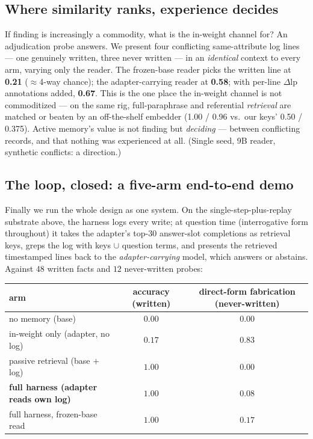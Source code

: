 \documentclass[11pt]{article}
\newcommand{\dlp}{\Delta\mathrm{lp}}
\begin{document}
\subsection{Where similarity ranks, experience decides}\label{sec:adjudication}

If finding is increasingly a commodity, what is the in-weight channel for? An adjudication
probe answers. We present four conflicting same-attribute log lines --- one genuinely written,
three never written --- in an \emph{identical} context to every arm, varying only the reader.
The frozen-base reader picks the written line at \textbf{0.21} ($\approx$4-way chance); the
adapter-carrying reader at \textbf{0.58}; with per-line $\dlp$ annotations added, \textbf{0.67}.
This is the one place the in-weight channel is not commoditized --- on the same rig,
full-paraphrase and referential \emph{retrieval} are matched or beaten by an off-the-shelf
embedder (1.00 / 0.96 vs.\ our keys' 0.50 / 0.375). Active memory's value is not finding but
\emph{deciding} --- between conflicting records, and that nothing was experienced at all.
(Single seed, 9B reader, synthetic conflicts: a direction.)

\subsection{The loop, closed: a five-arm end-to-end demo}\label{sec:e2edemo}

Finally we run the whole design as one system. On the single-step-plus-replay substrate above,
the harness logs every write; at question time (interrogative form throughout) it takes the
adapter's top-$30$ answer-slot completions as retrieval keys, greps the log with keys $\cup$
question terms, and presents the retrieved timestamped lines back to the \emph{adapter-carrying}
model, which answers or abstains. Against $48$ written facts and $12$ never-written probes:

\begin{center}\small
\setlength{\tabcolsep}{4pt}
\begin{tabular}{lcc}
\toprule
arm & accuracy (written) & direct-form fabrication (never-written) \\
\midrule
no memory (base)                  & $0.00$ & $0.00$ \\
in-weight only (adapter, no log)  & $0.17$ & $\mathbf{0.83}$ \\
passive retrieval (base $+$ log)  & $1.00$ & $0.00$ \\
\textbf{full harness (adapter reads own log)} & $\mathbf{1.00}$ & $\mathbf{0.08}$ \\
full harness, frozen-base read    & $1.00$ & $0.17$ \\
\bottomrule
\end{tabular}
\end{center}
\end{document}
